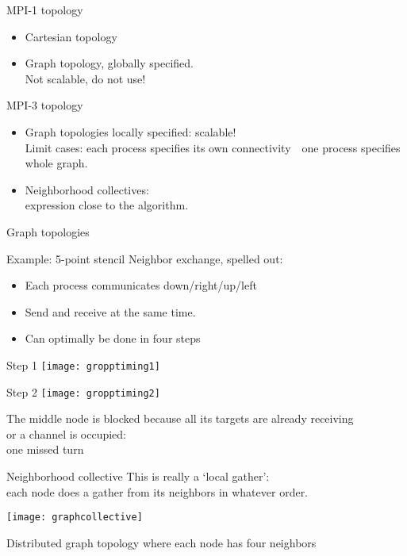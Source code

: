 \begin{numberedframe}{MPI-1 topology}
  \begin{itemize}
  \item Cartesian topology
  \item Graph topology, globally specified.\\
    Not scalable, do not use!
  \end{itemize}
\end{numberedframe}

\begin{numberedframe}{MPI-3 topology}
  \begin{itemize}
  \item Graph topologies locally specified: scalable!\\
    Limit cases: each process specifies its own connectivity~\
    one process specifies whole graph.
  \item Neighborhood collectives:\\
    expression close to the algorithm.
  \end{itemize}
\end{numberedframe}

 {Graph topologies}

\begin{numberedframe}{Example: 5-point stencil}
  Neighbor exchange,
  spelled out:
  \begin{itemize}
  \item Each process communicates down/right/up/left
  \item Send and receive at the same time.
  \item Can optimally be done in four steps
  \end{itemize}
\end{numberedframe}

\begin{numberedframe}{Step 1}
  \texttt{[image: gropptiming1]}
\end{numberedframe}

\begin{numberedframe}{Step 2}
  \texttt{[image: gropptiming2]}

  The middle node is blocked because all its targets
  are already receiving\\
  or a channel is occupied:\\
  one missed turn
\end{numberedframe}

\begin{numberedframe}{Neighborhood collective}
  \label{fig:graphcollective}
  This is really a `local gather':\\
  each node does a gather from its neighbors in whatever order.\\
  \indexmpishow{MPI_Neighbor_allgather}

  \texttt{[image: graphcollective]}

  Distributed graph topology where each
  node has four neighbors
\end{numberedframe}

